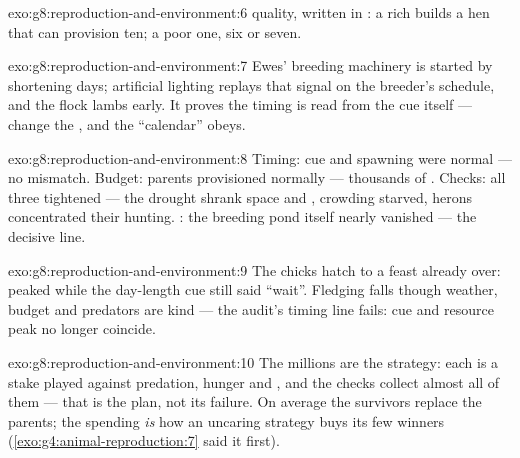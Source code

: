 \begin{solution}{exo:g8:reproduction-and-environment:6}
 quality, written in : a rich 
 builds a hen that can provision ten; a poor one,
six or seven.
\end{solution}

\begin{solution}{exo:g8:reproduction-and-environment:7}
Ewes' breeding machinery is started by shortening days;
artificial lighting replays that signal on the breeder's
schedule, and the flock lambs early. It proves the timing
is read from the cue itself --- change the , and the
``calendar'' obeys.
\end{solution}

\begin{solution}{exo:g8:reproduction-and-environment:8}
Timing: cue and spawning were normal --- no mismatch.
Budget: parents provisioned normally --- thousands of
. Checks: all three tightened --- the drought shrank
space and , crowding starved, herons concentrated
their hunting. : the breeding pond itself nearly
vanished --- the decisive line.
\end{solution}

\begin{solution}{exo:g8:reproduction-and-environment:9}
The chicks hatch to a feast already over: 
peaked while the day-length cue still said ``wait''.
Fledging falls though weather, budget and predators are
kind --- the audit's timing line fails: cue and resource
peak no longer coincide.
\end{solution}

\begin{solution}{exo:g8:reproduction-and-environment:10}
The millions are the strategy: each  is a stake played
against predation, hunger and , and the checks
collect almost all of them --- that is the plan, not its
failure. On average the survivors replace the parents;
the spending \emph{is} how an uncaring strategy buys its
few winners (\cref{exo:g4:animal-reproduction:7} said it
first).
\end{solution}


